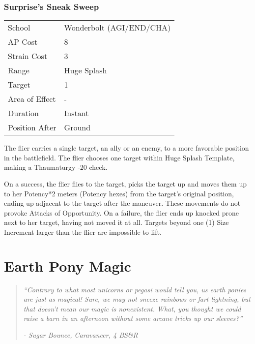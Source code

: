 \documentclass[11pt,a4paper,twocolumn]{book}
\begin{document}
\subsection*{Surprise's Sneak Sweep}
{
	\begin{tabu} to 75mm{| X[l,4] | X[l,7] |}
		\hline
		School 			& Wonderbolt (AGI/END/CHA)		\\
		AP Cost	      	& 8 				\\
		Strain Cost     & 3 				\\
		Range     		& Huge Splash		\\
		Target      	& 1 				\\
		Area of Effect  & - 	 			\\
		Duration     	& Instant 	 		\\
		Position After  & Ground 			\\ \hline
	\end{tabu}
	
}

\medskip

The flier carries a single target, an ally or an enemy, to a more favorable position in the battlefield. The flier chooses one target within Huge Splash Template, making a Thaumaturgy -20 check.

On a success, the flier flies to the target, picks the target up and moves them up to her Potency*2 meters (Potency hexes) from the target's original position, ending up adjacent to the target after the maneuver. These movements do not provoke Attacks of Opportunity. On a failure, the flier ends up knocked prone next to her target, having not moved it at all. Targets beyond one (1) Size Increment larger than the flier are impossible to lift.

\chapter{Earth Pony Magic}

\begin{quote}
	\emph{``Contrary to what most unicorns or pegasi would tell you, us earth ponies are just as magical! Sure, we may not sneeze rainbows or fart lightning, but that doesn't mean our magic is nonexistent. What, you thought we could raise a barn in an afternoon without some arcane tricks up our sleeves?''}
	
	\emph{- Sugar Bounce, Caravaneer, 4 BS\&R}
\end{quote}
\end{document}
